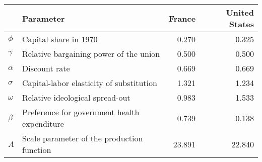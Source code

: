 
\begin{tabular}{llrr}
\toprule
\textbf{} & \textbf{Parameter} & \textbf{France} & \textbf{United States}\\
\midrule
$\phi$ & Capital share in 1970 & 0.270 & 0.325\\
$\gamma$ & Relative bargaining power of the union & 0.500 & 0.500\\
$\alpha$ & Discount rate & 0.669 & 0.669\\
$\sigma$ & Capital-labor elasticity of substitution & 1.321 & 1.234\\
$\omega$ & Relative ideological spread-out & 0.983 & 1.533\\
$\beta$ & Preference for government health expenditure & 0.739 & 0.138\\
$A$ & Scale parameter of the production function & 23.891 & 22.840\\
\bottomrule
\end{tabular}
